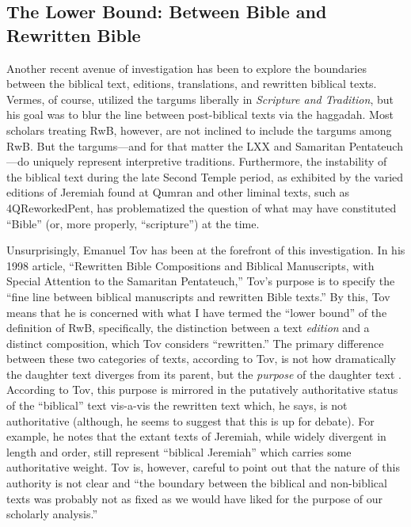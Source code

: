 \hypertarget{the-lower-bound-between-bible-and-rwb}{%
\subsection{The Lower Bound: Between Bible and
Rewritten Bible}\label{the-lower-bound-between-bible-and-rwb}}

Another recent avenue of investigation has been to explore the
boundaries between the biblical text, editions, translations, and
rewritten biblical texts. Vermes, of course, utilized the targums
liberally in \emph{Scripture and Tradition}, but his goal was to blur
the line between post-biblical texts via the haggadah. Most scholars
treating RwB, however, are not inclined to include the targums among
RwB. But the targums---and for that matter the LXX and Samaritan
Pentateuch---do uniquely represent interpretive traditions. Furthermore,
the instability of the biblical text during the late Second Temple
period, as exhibited by the varied editions of Jeremiah found at Qumran
and other liminal texts, such as 4QReworkedPent, has problematized the
question of what may have constituted ``Bible'' (or, more properly,
``scripture'') at the time.

Unsurprisingly, Emanuel Tov has been at the forefront of this
investigation. In his 1998 article, ``Rewritten Bible Compositions and
Biblical Manuscripts, with Special Attention to the Samaritan
Pentateuch,'' Tov's purpose is to specify the ``fine line between
biblical manuscripts and rewritten Bible
texts.''\autocite[334]{tov_dsd1998} By this, Tov means that he is
concerned with what I have termed the ``lower bound'' of the definition
of RwB, specifically, the distinction between a text \emph{edition} and
a distinct composition, which Tov considers ``rewritten.'' The primary
difference between these two categories of texts, according to Tov, is
not how dramatically the daughter text diverges from its parent, but the
\emph{purpose} of the daughter text \autocite[334]{tov_dsd1998}.
According to Tov, this purpose is mirrored in the putatively
authoritative status of the ``biblical'' text vis-a-vis the rewritten
text which, he says, is not authoritative (although, he seems to suggest
that this is up for debate\autocite[337]{tov_dsd1998}). For example, he
notes that the extant texts of Jeremiah, while widely divergent in
length and order, still represent ``biblical Jeremiah'' which carries
some authoritative weight. Tov is, however, careful to point out that
the nature of this authority is not clear and ``the boundary between the
biblical and non-biblical texts was probably not as fixed as we would
have liked for the purpose of our scholarly
analysis.''\autocite[335]{tov_dsd1998}

